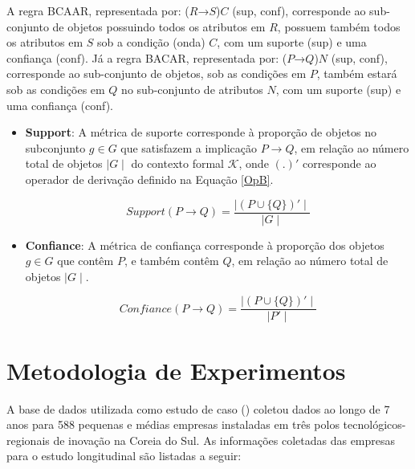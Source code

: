 \documentclass[kdmile,a4paper]{kdmile} %
\begin{document}
A regra BCAAR, representada por: ($R$→$S$)$C$ (sup, conf), corresponde ao sub-conjunto de objetos possuindo todos os atributos em $R$, possuem também todos os atributos em $S$ sob a condição (onda) $C$, com um suporte (sup) e uma confiança (conf). Já a regra BACAR, representada por: ($P$→$Q$)$N$ (sup, conf), corresponde ao sub-conjunto de objetos, sob as condições em $P$, também estará sob as condições em $Q$ no sub-conjunto de atributos $N$, com um suporte (sup) e uma confiança (conf).

\begin{itemize}
    \item \textbf{Support}: A métrica de suporte corresponde à proporção de objetos no subconjunto $g \in G$ que satisfazem a implicação \textit{$P \rightarrow Q$}, em relação ao número total de objetos $\mid G\mid$ do contexto formal $\mathcal{K}$, onde $(.)'$ corresponde ao operador de derivação definido na Equação \ref{OpB}.
 
\begin{equation}
\label{support}
Support(P \to Q) = \frac{ \mid (P \cup \{Q\})' \mid }{\mid G \mid}
\end{equation}
\end{itemize}


\begin{itemize}
    \item \textbf{Confiance}: A métrica de confiança corresponde à proporção dos objetos $g \in G$ que contêm $P$, e também contêm $Q$, em relação ao número total de objetos $\mid G\mid$.

\begin{equation}
\label{confidence}
Confiance(P \to Q) = \frac{\mid(P \cup \{Q\})' \mid}{ \mid P' \mid}
\end{equation}
\end{itemize}




\section{Metodologia de Experimentos}

A base de dados utilizada como estudo de caso (\cite{KIM2019103967}) coletou dados ao longo de 7 anos para 588 pequenas e médias empresas instaladas em três polos tecnológicos-regionais de inovação na Coreia do Sul. As informações coletadas das empresas para o estudo longitudinal são listadas a seguir:
\end{document}
